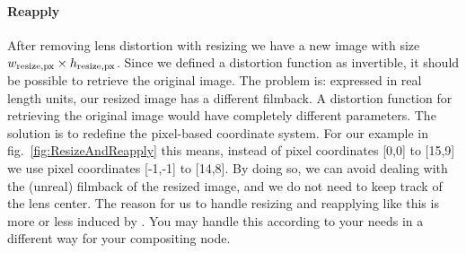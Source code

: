 \documentclass[10pt,a4paper]{article}
\begin{document}
\paragraph{Reapply}
After removing lens distortion with resizing we have a new image with size
$w_{\mathrm{resize,px}}\times h_{\mathrm{resize,px}}$.
Since we defined a distortion function as invertible, it should be possible
to retrieve the original image.
The problem is: expressed in real length units, our resized image has
a different filmback.
A distortion function for retrieving the original image would have
completely different parameters.
The solution is to redefine the pixel-based coordinate system.
For our example in fig.~\ref{fig:ResizeAndReapply} this means,
instead of pixel coordinates [0,0] to [15,9] we use pixel coordinates [-1,-1] to [14,8].
By doing so, we can avoid dealing with the (unreal) filmback of the resized image,
and we do not need to keep track of the lens center.
The reason for us to handle resizing and reapplying like this is
more or less induced by \warp. You may handle this according to your needs
in a different way for your compositing node.
%
\end{document}
